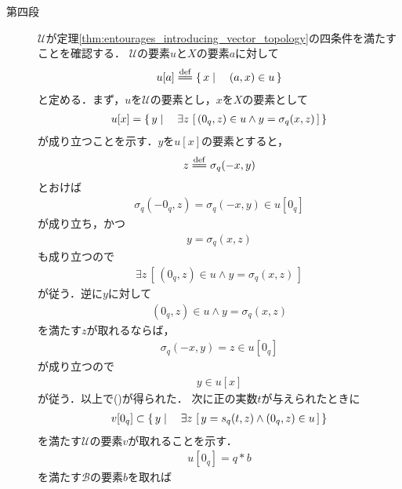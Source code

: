 \begin{sketch}
\begin{description}
			\item[第四段]
				$\mathscr{U}$が定理\ref{thm:entourages_introducing_vector_topology}の四条件を満たすことを確認する．
				$\mathscr{U}$の要素$u$と$X$の要素$a$に対して
				\begin{align}
					u[a] \defeq \Set{x}{(a,x) \in u}
				\end{align}
				と定める．まず，$u$を$\mathscr{U}$の要素とし，$x$を$X$の要素として
				\begin{align}
					u[x] = \left\{\, y \mid \quad \exists z\, \left[\, (0_q,z) \in u \wedge y = \sigma_q(x,z)\, \right]\, \right\}
					\label{fom:thm_quotient_topological_vector_space_2}
				\end{align}
				が成り立つことを示す．$y$を$u[x]$の要素とすると，
				\begin{align}
					z \defeq \sigma_q(-x,y)
				\end{align}
				とおけば
				\begin{align}
					\sigma_q\left(-0_q,z\right) = \sigma_q(-x,y) \in u[0_q]
				\end{align}
				が成り立ち，かつ
				\begin{align}
					y = \sigma_q(x,z)
				\end{align}
				も成り立つので
				\begin{align}
					\exists z\, \left[\, (0_q,z) \in u \wedge y = \sigma_q(x,z)\, \right]
				\end{align}
				が従う．逆に$y$に対して
				\begin{align}
					(0_q,z) \in u \wedge y = \sigma_q(x,z)
				\end{align}
				を満たす$z$が取れるならば，
				\begin{align}
					\sigma_q(-x,y) = z \in u[0_q]
				\end{align}
				が成り立つので
				\begin{align}
					y \in u[x]
				\end{align}
				が従う．以上で()が得られた．
				次に正の実数$t$が与えられたときに
				\begin{align}
					v[0_q] \subset \left\{\, y \mid \quad \exists z\, \left[\, y=s_q(t,z) \wedge (0_q,z) \in u\, \right]\, \right\}
					\label{fom:thm_quotient_topological_vector_space_3}
				\end{align}
				を満たす$\mathscr{U}$の要素$v$が取れることを示す．
				\begin{align}
					u[0_q] = q \ast b
				\end{align}
				を満たす$\mathscr{B}$の要素$b$を取れば
				\begin{align}

\end{align}
\end{description}
\end{sketch}
